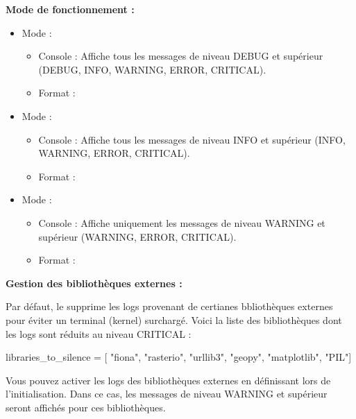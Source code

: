 \noindent\textbf{Mode de fonctionnement :}
\begin{itemize}[leftmargin=1.5cm]
    \item Mode  :
    \begin{itemize}
        \item Console : Affiche tous les messages de niveau DEBUG et supérieur (DEBUG, INFO, WARNING, ERROR, CRITICAL).
        \item Format : 
    \end{itemize}
    \item Mode  :
    \begin{itemize}
        \item Console : Affiche tous les messages de niveau INFO et supérieur (INFO, WARNING, ERROR, CRITICAL).
        \item Format : 
    \end{itemize}
    \item Mode  :
    \begin{itemize}
        \item Console : Affiche uniquement les messages de niveau WARNING et supérieur (WARNING, ERROR, CRITICAL).
        \item Format : 
    \end{itemize}
\end{itemize}

\vspace{1em}

\noindent\textbf{Gestion des bibliothèques externes :}

Par défaut, le  supprime les logs provenant de certianes bbliothèques externes pour éviter un terminal (kernel) surchargé. Voici la liste des bibliothèques dont les logs sont réduits au niveau CRITICAL :

\begin{pythoncode}[]
    libraries_to_silence = [
        "fiona",
        "rasterio",
        "urllib3",
        "geopy",
        "matplotlib",
        "PIL"]
\end{pythoncode}

Vous pouvez activer les logs des bibliothèques externes en définissant  lors de l'initialisation. Dans ce cas, les messages de niveau WARNING et supérieur seront affichés pour ces bibliothèques.

